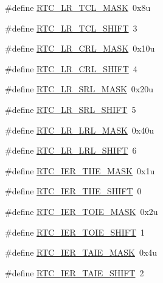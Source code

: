 \begin{DoxyCompactItemize}
\item 
\#define \hyperlink{group___r_t_c___register___masks_ga89f5d0ce94e7eb13bd961774fd440c0b}{R\+T\+C\+\_\+\+L\+R\+\_\+\+T\+C\+L\+\_\+\+M\+A\+SK}~0x8u
\item 
\#define \hyperlink{group___r_t_c___register___masks_ga3f1532cd2a9c7b767e2363ddde7777c4}{R\+T\+C\+\_\+\+L\+R\+\_\+\+T\+C\+L\+\_\+\+S\+H\+I\+FT}~3
\item 
\#define \hyperlink{group___r_t_c___register___masks_ga79d7286374cccca93261d4ced777c2e7}{R\+T\+C\+\_\+\+L\+R\+\_\+\+C\+R\+L\+\_\+\+M\+A\+SK}~0x10u
\item 
\#define \hyperlink{group___r_t_c___register___masks_ga170e66be6136b04cac5df94c81675cc5}{R\+T\+C\+\_\+\+L\+R\+\_\+\+C\+R\+L\+\_\+\+S\+H\+I\+FT}~4
\item 
\#define \hyperlink{group___r_t_c___register___masks_ga0681f481e213872418c16d5e012e5603}{R\+T\+C\+\_\+\+L\+R\+\_\+\+S\+R\+L\+\_\+\+M\+A\+SK}~0x20u
\item 
\#define \hyperlink{group___r_t_c___register___masks_ga33823f8e5a5e100db14493426af60d67}{R\+T\+C\+\_\+\+L\+R\+\_\+\+S\+R\+L\+\_\+\+S\+H\+I\+FT}~5
\item 
\#define \hyperlink{group___r_t_c___register___masks_gaf57761c6f1eb820b0d6764ae63e7dfcf}{R\+T\+C\+\_\+\+L\+R\+\_\+\+L\+R\+L\+\_\+\+M\+A\+SK}~0x40u
\item 
\#define \hyperlink{group___r_t_c___register___masks_ga723a045710e5df92a5bf5363e8cea08f}{R\+T\+C\+\_\+\+L\+R\+\_\+\+L\+R\+L\+\_\+\+S\+H\+I\+FT}~6
\item 
\#define \hyperlink{group___r_t_c___register___masks_ga4401cd4dce34a638f75403a2a3701e6d}{R\+T\+C\+\_\+\+I\+E\+R\+\_\+\+T\+I\+I\+E\+\_\+\+M\+A\+SK}~0x1u
\item 
\#define \hyperlink{group___r_t_c___register___masks_ga2938c56e7566549f7434b8f02ad6d478}{R\+T\+C\+\_\+\+I\+E\+R\+\_\+\+T\+I\+I\+E\+\_\+\+S\+H\+I\+FT}~0
\item 
\#define \hyperlink{group___r_t_c___register___masks_ga1dfc25308bec00f67925ae796f805d3d}{R\+T\+C\+\_\+\+I\+E\+R\+\_\+\+T\+O\+I\+E\+\_\+\+M\+A\+SK}~0x2u
\item 
\#define \hyperlink{group___r_t_c___register___masks_gaf9355764ec83dde6e2890f391a469856}{R\+T\+C\+\_\+\+I\+E\+R\+\_\+\+T\+O\+I\+E\+\_\+\+S\+H\+I\+FT}~1
\item 
\#define \hyperlink{group___r_t_c___register___masks_gad1bcc4df9a637ec5ab4b611391986c06}{R\+T\+C\+\_\+\+I\+E\+R\+\_\+\+T\+A\+I\+E\+\_\+\+M\+A\+SK}~0x4u
\item 
\#define \hyperlink{group___r_t_c___register___masks_gae15cd7098592da4c3a2c2563879ae5d8}{R\+T\+C\+\_\+\+I\+E\+R\+\_\+\+T\+A\+I\+E\+\_\+\+S\+H\+I\+FT}~2

\end{DoxyCompactItemize}
